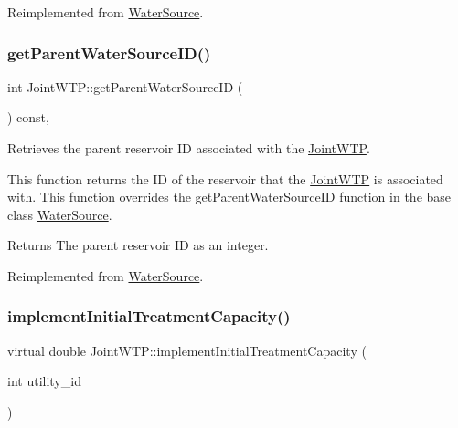 Reimplemented from \mbox{\hyperlink{classWaterSource_ad943083d8b3bee60ad8d106bba8a5faa}{Water\+Source}}.

\mbox{\label{classJointWTP_ae4805e616725c109f23c0513d6ef2711}} 
\subsubsection{\texorpdfstring{get\+Parent\+Water\+Source\+I\+D()}{getParentWaterSourceID()}}
{\footnotesize\ttfamily int Joint\+W\+T\+P\+::get\+Parent\+Water\+Source\+ID (\begin{DoxyParamCaption}{ }\end{DoxyParamCaption}) const\hspace{0.3cm}{\ttfamily [override]}, {\ttfamily [virtual]}}



Retrieves the parent reservoir ID associated with the \mbox{\hyperlink{classJointWTP}{Joint\+W\+TP}}. 

This function returns the ID of the reservoir that the {\ttfamily \mbox{\hyperlink{classJointWTP}{Joint\+W\+TP}}} is associated with. This function overrides the {\ttfamily get\+Parent\+Water\+Source\+ID} function in the base class {\ttfamily \mbox{\hyperlink{classWaterSource}{Water\+Source}}}.

\begin{DoxyReturn}{Returns}
The parent reservoir ID as an integer. 
\end{DoxyReturn}


Reimplemented from \mbox{\hyperlink{classWaterSource_a506c77317ae84db0a4d9ea2cd74ddb11}{Water\+Source}}.

\mbox{\label{classJointWTP_ae8a2a5c4d5173b43d30fc9c1169574f8}} 
\subsubsection{\texorpdfstring{implement\+Initial\+Treatment\+Capacity()}{implementInitialTreatmentCapacity()}}
{\footnotesize\ttfamily virtual double Joint\+W\+T\+P\+::implement\+Initial\+Treatment\+Capacity (\begin{DoxyParamCaption}\item[{int}]{utility\+\_\+id }\end{DoxyParamCaption})\hspace{0.3cm}{\ttfamily [virtual]}}



